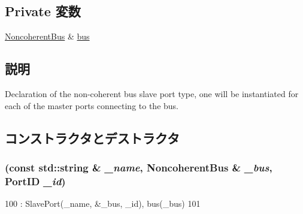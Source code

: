 \subsection*{Private 変数}
\begin{DoxyCompactItemize}
\item 
\hyperlink{classNoncoherentBus}{NoncoherentBus} \& \hyperlink{classNoncoherentBus_1_1NoncoherentBusSlavePort_aea8faab4afa44810e2dfac0ab026fb82}{bus}
\end{DoxyCompactItemize}


\subsection{説明}
Declaration of the non-\/coherent bus slave port type, one will be instantiated for each of the master ports connecting to the bus. 

\subsection{コンストラクタとデストラクタ}
\hypertarget{classNoncoherentBus_1_1NoncoherentBusSlavePort_aeea60f0b9850ceae5faa8726f2d4d19a}{
\subsubsection[{NoncoherentBusSlavePort}]{ (const std::string \& {\em \_\-name}, \/  {\bf NoncoherentBus} \& {\em \_\-bus}, \/  {\bf PortID} {\em \_\-id})}}
\label{classNoncoherentBus_1_1NoncoherentBusSlavePort_aeea60f0b9850ceae5faa8726f2d4d19a}



\begin{DoxyCode}
100             : SlavePort(_name, &_bus, _id), bus(_bus)
101         { }
\end{DoxyCode}


